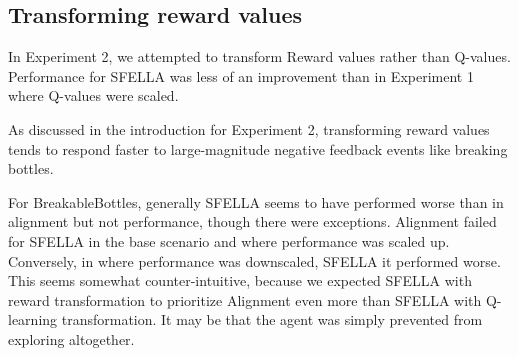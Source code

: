 



\subsection{Transforming reward values}

In Experiment 2, we attempted to transform Reward values rather than Q-values. Performance for SFELLA was less of an improvement than in Experiment 1 where Q-values were scaled.

As discussed in the introduction for Experiment 2, transforming reward values tends to respond faster to large-magnitude negative feedback events like breaking bottles. 

For BreakableBottles, generally SFELLA seems to have performed worse than \tloA in alignment but not performance, though there were exceptions. Alignment failed for SFELLA in the base scenario and where performance was scaled up. Conversely, in where performance was downscaled, SFELLA it performed worse. This seems somewhat counter-intuitive, because we expected SFELLA with reward transformation to prioritize Alignment even more than SFELLA with Q-learning transformation. It may be that the agent was simply prevented from exploring altogether.


